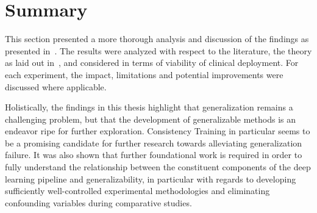 \section{Summary}
This section presented a more thorough analysis and discussion of the findings as presented in~. The results were analyzed with respect to the literature, the theory as laid out in~, and considered in terms of viability of clinical deployment. For each experiment, the impact, limitations and potential improvements were discussed where applicable. 

Holistically, the findings in this thesis highlight that generalization remains a challenging problem, but that the development of generalizable methods is an endeavor ripe for further exploration. Consistency Training in particular seems to be a promising candidate for further research towards alleviating generalization failure. It was also shown that further foundational work is required in order to fully understand the relationship between the constituent components of the deep learning pipeline and generalizability, in particular with regards to developing sufficiently well-controlled experimental methodologies and eliminating confounding variables during comparative studies. 